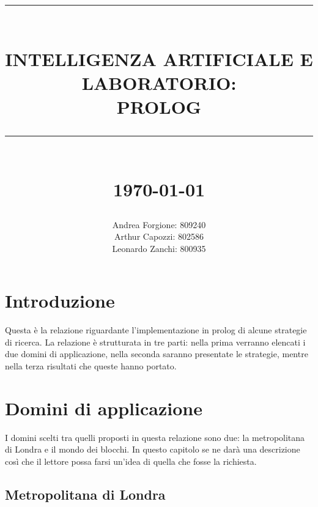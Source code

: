 \documentclass[12pt]{report}
\newcommand{\HRule}[1]{\rule{\linewidth}{#1}}
\begin{document}
\title{ \normalsize \textsc{}
        \\ [2.0cm]
        \HRule{0.5pt} \\
        \LARGE \textbf{\uppercase{Intelligenza Artificiale e Laboratorio: \\ Prolog}}
        \HRule{2pt} \\ [0.5cm]
        \normalsize \today \vspace*{5\baselineskip}}

\date{}

\author{
        Andrea Forgione: 809240 \\ 
        Arthur Capozzi:  802586 \\
        Leonardo Zanchi: 800935}

\maketitle
\tableofcontents
\newpage

\sectionfont{\scshape}


\chapter*{Introduzione}
Questa \`e la relazione riguardante l'implementazione in prolog di alcune strategie di ricerca.
La relazione \`e strutturata in tre parti: nella prima verranno elencati i due domini di applicazione, nella seconda saranno presentate le strategie, mentre nella terza risultati che queste hanno portato.

\chapter{Domini di applicazione}
I domini scelti tra quelli proposti in questa relazione sono due: la metropolitana di Londra e il mondo dei blocchi.
In questo capitolo se ne darà una descrizione cos\`i che il lettore possa farsi un'idea di quella che fosse la richiesta.

\section{Metropolitana di Londra}
\end{document}
